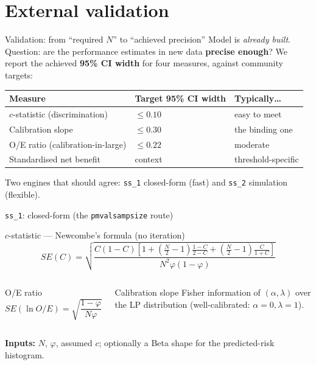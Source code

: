 \documentclass[10pt,aspectratio=169]{beamer}
\begin{document}
\section{External validation }
\begin{frame}{Validation: from ``required $N$'' to ``achieved precision''}
  Model is \emph{already built}. Question: are the performance estimates in new data \textbf{precise enough}?
  \vfill
  We report the achieved \textbf{95\% CI width} for four measures, against community targets:
  \begin{center}
  \begin{tabular}{@{}lll@{}}
    \toprule
    \textbf{Measure} & \textbf{Target 95\% CI width} & \textbf{Typically\ldots}\\
    \midrule
    $c$-statistic (discrimination)      & $\le 0.10$ & easy to meet\\
    Calibration slope                   & $\le 0.30$ & \alert{the binding one}\\
    O/E ratio (calibration-in-large)    & $\le 0.22$ & moderate\\
    Standardised net benefit            & context     & threshold-specific\\
    \bottomrule
  \end{tabular}
  \end{center}
  \vfill
  {\scriptsize Two engines that should agree: \texttt{ss\_1} closed-form (fast) and \texttt{ss\_2} simulation (flexible).}
\end{frame}

\begin{frame}{\texttt{ss\_1}: closed-form (the \texttt{pmvalsampsize} route)}
  \begin{block}{$c$-statistic --- Newcombe's formula (no iteration)}
    \[
      SE(C)=\sqrt{\frac{C(1-C)\left[1+\left(\tfrac{N}{2}-1\right)\tfrac{1-C}{2-C}+\left(\tfrac{N}{2}-1\right)\tfrac{C}{1+C}\right]}{N^2\varphi(1-\varphi)}}
    \]
  \end{block}
  \begin{columns}[t]
      \begin{block}{O/E ratio}
        $SE(\ln O/E)=\sqrt{\dfrac{1-\varphi}{N\varphi}}$
      \end{block}
      \begin{block}{Calibration slope}
        Fisher information of $(\alpha,\lambda)$ over the LP distribution (well-calibrated: $\alpha{=}0,\lambda{=}1$).
      \end{block}
  \end{columns}
  \vfill
  {\scriptsize \textbf{Inputs:} $N$, $\varphi$, assumed $c$; optionally a Beta shape for the predicted-risk histogram.}
\end{frame}
\end{document}
